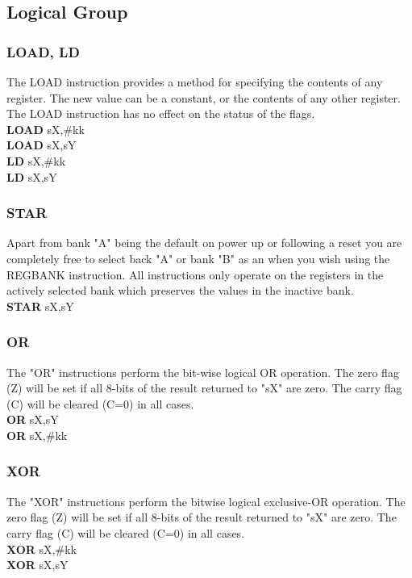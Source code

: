     \subsection{Logical Group}
        \subsubsection{LOAD, LD}
            The LOAD instruction provides a method for specifying the contents of any register. The new value can be a constant, or the contents of any other register. The LOAD instruction has no effect on the status of the flags.\\
            \textbf{LOAD} sX,\#kk\\
            \textbf{LOAD} sX,sY\\
            \textbf{LD} sX,\#kk\\
            \textbf{LD} sX,sY\\

        \subsubsection{STAR}
            Apart from bank "A" being the default on power up or following a reset you are completely free to select back "A" or bank "B" as an when you wish using the REGBANK instruction. All instructions only operate on the registers in the actively selected bank which preserves the values in the inactive bank.\\
            \textbf{STAR} sX,sY\\

        \subsubsection{OR}
            The "OR" instructions perform the bit-wise logical OR operation. The zero flag (Z) will be set if all 8-bits of the result returned to "sX" are zero. The carry flag (C) will be cleared (C=0) in all cases.\\
            \textbf{OR} sX,sY\\
            \textbf{OR} sX,\#kk\\

        \subsubsection{XOR}
            The "XOR" instructions perform the bit\-wise logical exclusive-OR operation. The zero flag (Z) will be set if all 8-bits of the result returned to "sX" are zero. The carry flag (C) will be cleared (C=0) in all cases.\\
            \textbf{XOR} sX,\#kk\\
            \textbf{XOR} sX,sY\\

